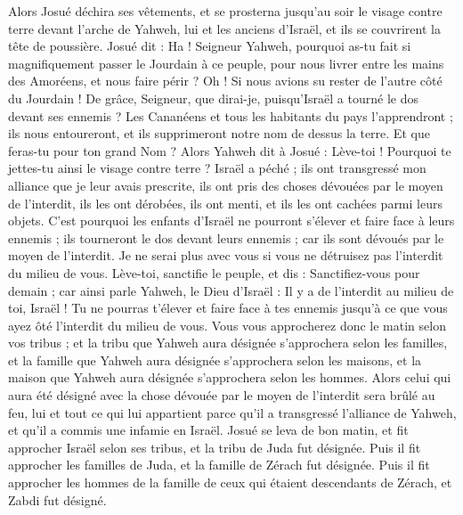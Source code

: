 \begin{multicols}{2}
Alors Josué déchira ses vêtements, et se prosterna jusqu’au soir le visage contre terre devant l’arche de Yahweh, lui et les anciens d’Israël, et ils se couvrirent la tête de poussière.
Josué dit : Ha ! Seigneur Yahweh, pourquoi as-tu fait si magnifiquement passer le Jourdain à ce peuple, pour nous livrer entre les mains des Amoréens, et nous faire périr ? Oh ! Si nous avions su rester de l’autre côté du Jourdain !
De grâce, Seigneur, que dirai-je, puisqu’Israël a tourné le dos devant ses ennemis ?
Les Cananéens et tous les habitants du pays l’apprendront ; ils nous entoureront, et ils supprimeront notre nom de dessus la terre. Et que feras-tu pour ton grand Nom ?
Alors Yahweh dit à Josué : Lève-toi ! Pourquoi te jettes-tu ainsi le visage contre terre ?
Israël a péché ; ils ont transgressé mon alliance que je leur avais prescrite, ils ont pris des choses dévouées par le moyen de l'interdit, ils les ont dérobées, ils ont menti, et ils les ont cachées parmi leurs objets.
C’est pourquoi les enfants d’Israël ne pourront s’élever et faire face à leurs ennemis ; ils tourneront le dos devant leurs ennemis ; car ils sont dévoués par le moyen de l'interdit. Je ne serai plus avec vous si vous ne détruisez pas l’interdit du milieu de vous.
Lève-toi, sanctifie le peuple, et dis : Sanctifiez-vous pour demain ; car ainsi parle Yahweh, le Dieu d’Israël : Il y a de l’interdit au milieu de toi, Israël ! Tu ne pourras t’élever et faire face à tes ennemis jusqu’à ce que vous ayez ôté l’interdit du milieu de vous.
Vous vous approcherez donc le matin selon vos tribus ; et la tribu que Yahweh aura désignée s’approchera selon les familles, et la famille que Yahweh aura désignée s’approchera selon les maisons, et la maison que Yahweh aura désignée s’approchera selon les hommes.
Alors celui qui aura été désigné avec la chose dévouée par le moyen de l'interdit sera brûlé au feu, lui et tout ce qui lui appartient parce qu’il a transgressé l’alliance de Yahweh, et qu’il a commis une infamie en Israël.
Josué se leva de bon matin, et fit approcher Israël selon ses tribus, et la tribu de Juda fut désignée.
Puis il fit approcher les familles de Juda, et la famille de Zérach fut désignée. Puis il fit approcher les hommes de la famille de ceux qui étaient descendants de Zérach, et Zabdi fut désigné.

\end{multicols}
